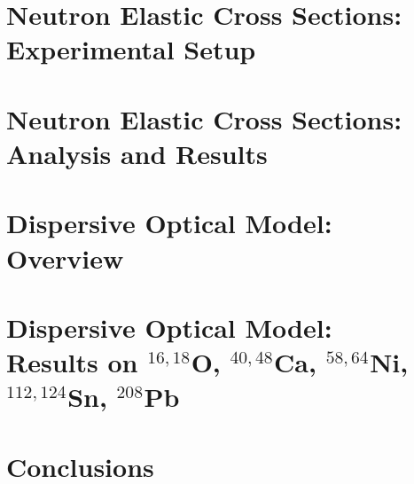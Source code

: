 \documentclass[12pt]{book} %
\newcommand{\oSixEight}{\ensuremath{^{16,18}}O}
\newcommand{\caAughtEight}{\ensuremath{^{40,48}}Ca}
\newcommand{\niEightFour}{\ensuremath{^{58,64}}Ni}
\newcommand{\snTwelveFour}{\ensuremath{^{112,124}}Sn}
\newcommand{\pbEight}{\ensuremath{^{208}}Pb}
\newcommand{\textDirectory}{text}
\begin{document}
\chapter{Neutron Elastic Cross Sections: Experimental Setup} \label{ECSExperiment}


\chapter{Neutron Elastic Cross Sections: Analysis and Results} \label{ECSAnalysis}


\chapter{Dispersive Optical Model: Overview} \label{DOMFormalism}


\chapter{Dispersive Optical Model:\protect\\ Results on \oSixEight, \caAughtEight,
\niEightFour, \snTwelveFour, \pbEight}\label{DOMResults}
%

\chapter{Conclusions}


\clearpage %

\fancyhead{} %
\fancyhead[LE]{\MakeUppercase{ \leftmark}} %

\clearpage
{}

\singlespacing


\doublespacing

\clearpage
\end{document}
